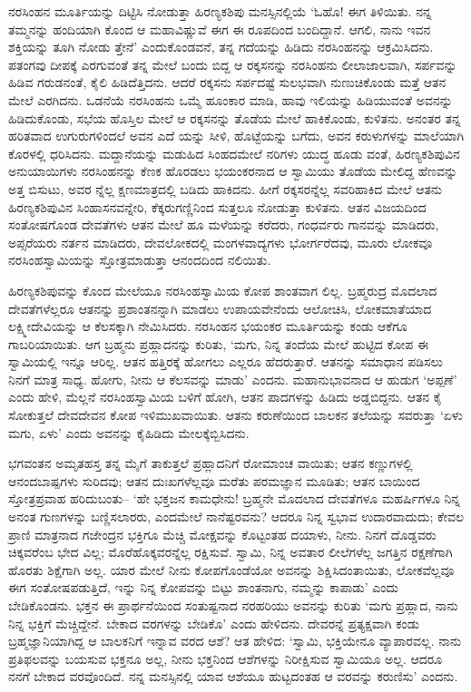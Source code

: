 ನರಸಿಂಹನ ಮೂರ್ತಿಯನ್ನು ದಿಟ್ಟಿಸಿ ನೋಡುತ್ತಾ ಹಿರಣ್ಯಕಶಿಪು ಮನಸ್ಸಿನಲ್ಲಿಯೆ ‘ಓಹೊ! ಈಗ ತಿಳಿಯಿತು. ನನ್ನ ತಮ್ಮನನ್ನು ಹಂದಿಯಾಗಿ ಕೊಂದ ಆ ಮಹಾವಿಷ್ಣುವೆ ಈಗ ಈ ರೂಪದಿಂದ ಬಂದಿದ್ದಾನೆ. ಆಗಲಿ, ನಾನು ಇವನ ಶಕ್ತಿಯನ್ನು ತೂಗಿ ನೋಡು ತ್ತೇನೆ’ ಎಂದುಕೊಂಡವನೆ, ತನ್ನ ಗದೆಯನ್ನು ಹಿಡಿದು ನರಸಿಂಹನನ್ನು ಆಕ್ರಮಿಸಿದನು. ಪತಂಗವು ದೀಪಕ್ಕೆ ಎರಗುವಂತೆ ತನ್ನ ಮೇಲೆ ಬಂದು ಬಿದ್ದ ಆ ರಕ್ಕಸನನ್ನು ನರಸಿಂಹನು ಲೀಲಾಜಾಲವಾಗಿ, ಸರ್ಪವನ್ನು ಹಿಡಿವ ಗರುಡನಂತೆ, ಕೈಲಿ ಹಿಡಿದೆತ್ತಿದನು. ಆದರೆ ರಕ್ಕಸನು ಸರ್ಪದಷ್ಟೆ ಸುಲಭವಾಗಿ ನುಣುಚಿಕೊಂಡು ಮತ್ತೆ ಆತನ ಮೇಲೆ ಎರಗಿದನು. ಒಡನೆಯೆ ನರಸಿಂಹನು ಒಮ್ಮೆ ಹೂಂಕಾರ ಮಾಡಿ, ಹಾವು ಇಲಿಯನ್ನು ಹಿಡಿಯುವಂತೆ ಅವನನ್ನು ಹಿಡಿದುಕೊಂಡು, ಸಭೆಯ ಹೊಸ್ತಿಲ ಮೇಲೆ ಆ ರಕ್ಕಸನನ್ನು ತೊಡೆಯ ಮೇಲೆ ಹಾಕಿಕೊಂಡು, ಕುಳಿತನು. ಅನಂತರ ತನ್ನ ಹರಿತವಾದ ಉಗುರುಗಳಿಂದಲೆ ಅವನ ಎದೆ ಯನ್ನು ಸೀಳಿ, ಹೊಟ್ಟೆಯನ್ನು ಬಗೆದು, ಅವನ ಕರುಳುಗಳನ್ನು ಮಾಲೆಯಾಗಿ ಕೊರಳಲ್ಲಿ ಧರಿಸಿದನು. ಮದ್ದಾನೆಯನ್ನು ಮಡುಹಿದ ಸಿಂಹದಮೇಲೆ ನರಿಗಳು ಯುದ್ಧ ಹೂಡು ವಂತೆ, ಹಿರಣ್ಯಕಶಿಪುವಿನ ಅನುಯಾಯಿಗಳು ನರಸಿಂಹನನ್ನು ಕೆಣಕ ಹೊರಡಲು ಭಯಂಕರನಾದ ಆ ಸ್ವಾಮಿಯು ತೊಡೆಯ ಮೇಲಿದ್ದ ಹೆಣವನ್ನು ಅತ್ತ ಬಿಸುಟು, ಅವರ ನ್ನೆಲ್ಲ ಕ್ಷಣಮಾತ್ರದಲ್ಲಿ ಬಡಿದು ಹಾಕಿದನು. ಹೀಗೆ ರಕ್ಕಸರನ್ನೆಲ್ಲ ಸವರಿಹಾಕಿದ ಮೇಲೆ ಆತನು ಹಿರಣ್ಯಕಶಿಪುವಿನ ಸಿಂಹಾಸನವನ್ನೇರಿ, ಕೆಕ್ಕರುಗಣ್ಣಿನಿಂದ ಸುತ್ತಲೂ ನೋಡುತ್ತಾ ಕುಳಿತನು. ಆತನ ವಿಜಯದಿಂದ ಸಂತೋಷಗೊಂಡ ದೇವತೆಗಳು ಆತನ ಮೇಲೆ ಹೂ ಮಳೆಯನ್ನು ಕರೆದರು, ಗಂಧರ್ವರು ಗಾನವನ್ನು ಮಾಡಿದರು, ಅಪ್ಸರೆಯರು ನರ್ತನ ಮಾಡಿದರು, ದೇವಲೋಕದಲ್ಲಿ ಮಂಗಳವಾದ್ಯಗಳು ಭೋರ್ಗರೆದವು, ಮೂರು ಲೋಕವೂ ನರಸಿಂಹಸ್ವಾಮಿಯನ್ನು ಸ್ತೋತ್ರಮಾಡುತ್ತಾ ಆನಂದದಿಂದ ನಲಿಯಿತು.

ಹಿರಣ್ಯಕಶಿಪುವನ್ನು ಕೊಂದ ಮೇಲೆಯೂ ನರಸಿಂಹಸ್ವಾಮಿಯ ಕೋಪ ಶಾಂತವಾಗ ಲಿಲ್ಲ. ಬ್ರಹ್ಮರುದ್ರ ಮೊದಲಾದ ದೇವತೆಗಳೆಲ್ಲರೂ ಆತನನ್ನು ಪ್ರಶಾಂತನನ್ನಾಗಿ ಮಾಡಲು ಉಪಾಯವೇನೆಂದು ಆಲೋಚಿಸಿ, ಲೋಕಮಾತೆಯಾದ ಲಕ್ಷ್ಮೀದೇವಿಯನ್ನು ಆ ಕೆಲಸಕ್ಕಾಗಿ ನೇಮಿಸಿದರು. ನರಸಿಂಹನ ಭಯಂಕರ ಮೂರ್ತಿಯನ್ನು ಕಂಡು ಆಕೆಗೂ ಗಾಬರಿಯಾಯಿತು. ಆಗ ಬ್ರಹ್ಮನು ಪ್ರಹ್ಲಾದನನ್ನು ಕುರಿತು, ‘ಮಗು, ನಿನ್ನ ತಂದೆಯ ಮೇಲೆ ಹುಟ್ಟಿದ ಕೋಪ ಈ ಸ್ವಾಮಿಯಲ್ಲಿ ಇನ್ನೂ ಆರಿಲ್ಲ. ಆತನ ಹತ್ತಿರಕ್ಕೆ ಹೋಗಲು ಎಲ್ಲರೂ ಹೆದರುತ್ತಾರೆ. ಆತನನ್ನು ಸಮಾಧಾನ ಪಡಿಸಲು ನಿನಗೆ ಮಾತ್ರ ಸಾಧ್ಯ. ಹೋಗು, ನೀನು ಆ ಕೆಲಸವನ್ನು ಮಾಡು’ ಎಂದನು. ಮಹಾನುಭಾವನಾದ ಆ ಹುಡುಗ ‘ಅಪ್ಪಣೆ’ ಎಂದು ಹೇಳಿ, ಮೆಲ್ಲನೆ ನರಸಿಂಹಸ್ವಾಮಿಯ ಬಳಿಗೆ ಹೋಗಿ, ಆತನ ಪಾದಗಳನ್ನು ಹಿಡಿದು ಅಡ್ಡಬಿದ್ದನು. ಆತನ ಕೈ ಸೋಕುತ್ತಲೆ ದೇವದೇವನ ಕೋಪ ಇಳಿಮುಖವಾಯಿತು. ಆತನು ಕರುಣೆಯಿಂದ ಬಾಲಕನ ತಲೆಯನ್ನು ಸವರುತ್ತಾ ‘ಏಳು ಮಗು, ಏಳು’ ಎಂದು ಅವನನ್ನು ಕೈಹಿಡಿದು ಮೇಲಕ್ಕೆಬ್ಬಿಸಿದನು.

ಭಗವಂತನ ಅಮೃತಹಸ್ತ ತನ್ನ ಮೈಗೆ ತಾಕುತ್ತಲೆ ಪ್ರಹ್ಲಾದನಿಗೆ ರೋಮಾಂಚ ವಾಯಿತು; ಆತನ ಕಣ್ಣುಗಳಲ್ಲಿ ಆನಂದಬಾಷ್ಪಗಳು ಸುರಿದವು; ಆತನ ದುಃಖಗಳೆಲ್ಲವೂ ಮರೆತು ಪರಮಜ್ಞಾನ ಮೂಡಿತು; ಆತನ ಬಾಯಿಂದ ಸ್ತೋತ್ರಪ್ರವಾಹ ಹರಿದುಬಂತು– ‘ಹೇ ಭಕ್ತಜನ ಕಾಮಧೇನು! ಬ್ರಹ್ಮನೇ ಮೊದಲಾದ ದೇವತೆಗಳೂ ಮಹರ್ಷಿಗಳೂ ನಿನ್ನ ಅನಂತ ಗುಣಗಳನ್ನು ಬಣ್ಣಿಸಲಾರರು, ಎಂದಮೇಲೆ ನಾನೆಷ್ಟರವನು? ಆದರೂ ನಿನ್ನ ಸ್ವಭಾವ ಉದಾರವಾದುದು; ಕೇವಲ ಪ್ರಾಣಿ ಮಾತ್ರನಾದ ಗಜೇಂದ್ರನ ಭಕ್ತಿಗೂ ಮೆಚ್ಚಿ ಮೋಕ್ಷವನ್ನು ಕೊಟ್ಟಂತಹ ದಯಾಳು, ನೀನು. ನಿನಗೆ ದೊಡ್ಡವರು ಚಿಕ್ಕವರೆಂಬ ಭೇದ ವಿಲ್ಲ; ಮೊರೆಹೊಕ್ಕವರನ್ನೆಲ್ಲ ರಕ್ಷಿಸುವೆ. ಸ್ವಾಮಿ, ನಿನ್ನ ಅವತಾರ ಲೀಲೆಗಳೆಲ್ಲ ಜಗತ್ತಿನ ರಕ್ಷಣೆಗಾಗಿ ಹೊರತು ಶಿಕ್ಷೆಗಾಗಿ ಅಲ್ಲ. ಯಾರ ಮೇಲೆ ನೀನು ಕೋಪಗೊಂಡೆಯೋ ಅವನನ್ನು ಶಿಕ್ಷಿಸಿದಂತಾಯಿತು, ಲೋಕವೆಲ್ಲವೂ ಈಗ ಸಂತೋಷಪಡುತ್ತಿದೆ, ಇನ್ನು ನಿನ್ನ ಕೋಪವನ್ನು ಬಿಟ್ಟು ಶಾಂತನಾಗು, ನಮ್ಮನ್ನು ಕಾಪಾಡು’ ಎಂದು ಬೇಡಿಕೊಂಡನು. ಭಕ್ತನ ಈ ಪ್ರಾರ್ಥನೆಯಿಂದ ಸಂತುಷ್ಟನಾದ ನರಹರಿಯು ಅವನನ್ನು ಕುರಿತು ‘ಮಗು ಪ್ರಹ್ಲಾದ, ನಾನು ನಿನ್ನ ಭಕ್ತಿಗೆ ಮೆಚ್ಚಿದ್ದೇನೆ. ಬೇಕಾದ ವರಗಳನ್ನು ಬೇಡಿಕೊ’ ಎಂದು ಹೇಳಿದನು. ದೇವರನ್ನೆ ಪ್ರತ್ಯಕ್ಷವಾಗಿ ಕಂಡು ಬ್ರಹ್ಮಜ್ಞಾನಿಯಾಗಿದ್ದ ಆ ಬಾಲಕನಿಗೆ ಇನ್ನಾವ ವರದ ಆಶೆ? ಆತ ಹೇಳಿದ: ‘ಸ್ವಾಮಿ, ಭಕ್ತಿಯೇನೂ ವ್ಯಾಪಾರವಲ್ಲ. ನಾನು ಪ್ರತಿಫಲವನ್ನು ಬಯಸುವ ಭಕ್ತನೂ ಅಲ್ಲ, ನೀನು ಭಕ್ತನಿಂದ ಆಶೆಗಳನ್ನು ನಿರೀಕ್ಷಿಸುವ ಸ್ವಾಮಿಯೂ ಅಲ್ಲ. ಆದರೂ ನನಗೆ ಬೇಕಾದ ವರವೊಂದಿದೆ. ನನ್ನ ಮನಸ್ಸಿನಲ್ಲಿ ಯಾವ ಆಶೆಯೂ ಹುಟ್ಟದಂತಹ ಆ ವರವನ್ನು ಕರುಣಿಸು’ ಎಂದನು.

